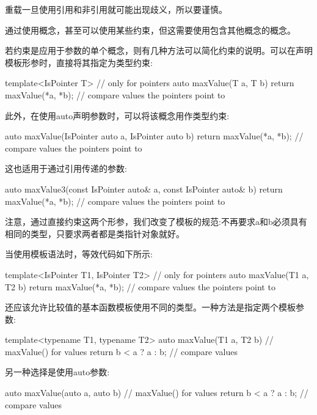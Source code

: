重载一旦使用引用和非引用就可能出现歧义，所以要谨慎。

通过使用概念，甚至可以使用某些约束，但这需要使用包含其他概念的概念。


若约束是应用于参数的单个概念，则有几种方法可以简化约束的说明。可以在声明模板形参时，直接将其指定为类型约束:

\begin{cpp}
template<IsPointer T> // only for pointers
auto maxValue(T a, T b)
{
	return maxValue(*a, *b); // compare values the pointers point to
}
\end{cpp}

此外，在使用auto声明参数时，可以将该概念用作类型约束:

\begin{cpp}
auto maxValue(IsPointer auto a, IsPointer auto b)
{
	return maxValue(*a, *b); // compare values the pointers point to
}
\end{cpp}

这也适用于通过引用传递的参数:

\begin{cpp}
auto maxValue3(const IsPointer auto& a, const IsPointer auto& b)
{
	return maxValue(*a, *b); // compare values the pointers point to
}
\end{cpp}

注意，通过直接约束这两个形参，我们改变了模板的规范:不再要求a和b必须具有相同的类型，只要求两者都是类指针对象就好。

当使用模板语法时，等效代码如下所示:

\begin{cpp}
template<IsPointer T1, IsPointer T2> // only for pointers
auto maxValue(T1 a, T2 b)
{
	return maxValue(*a, *b); // compare values the pointers point to
}
\end{cpp}

还应该允许比较值的基本函数模板使用不同的类型。一种方法是指定两个模板参数:

\begin{cpp}
template<typename T1, typename T2>
auto maxValue(T1 a, T2 b) // maxValue() for values
{
	return b < a ? a : b; // compare values
}
\end{cpp}

另一种选择是使用auto参数:

\begin{cpp}
auto maxValue(auto a, auto b) // maxValue() for values
{
	return b < a ? a : b; // compare values
}
\end{cpp}

